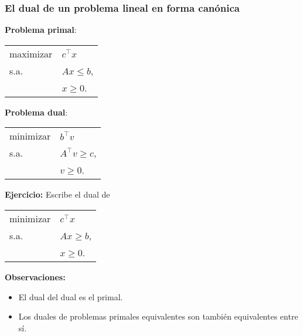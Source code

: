 \documentclass{beamer}
\begin{document}
\begin{frame}
\frametitle{El dual de un problema lineal en forma canónica}

\textbf{Problema primal}:

\begin{center}
\begin{tabular}{ll}
maximizar & $c^\top x$  \\
s.a. & $Ax\leq b$,     \\
	 & $x\geq 0$.  
\end{tabular}
\end{center}

\textbf{Problema dual}:

\begin{center}
\begin{tabular}{ll}
minimizar & $b^\top v$  \\
s.a. & $A^\top v \geq c$,     \\
	 & $v\geq 0$.  
\end{tabular}
\end{center}


\textbf{Ejercicio:} Escribe el dual de
\begin{center}
\begin{tabular}{ll}
minimizar & $c^\top x$  \\
s.a. & $Ax\geq b$,     \\
	 & $x\geq 0$.  
\end{tabular}
\end{center}



\textbf{Observaciones:}

\begin{itemize}
\item El dual del dual es el primal.
\item Los duales de problemas primales equivalentes son también equivalentes entre sí.
\end{itemize}


\end{frame}
\end{document}
